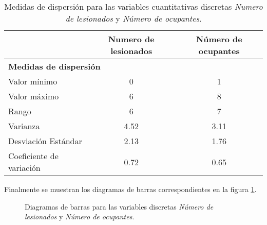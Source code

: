 \begin{table}[!htbp]
    \begin{footnotesize}
        \centering
        \begin{tabular}{lc|c}
            \toprule
            {} & \textbf{Numero de lesionados} & \textbf{Número de ocupantes} \\
            \bottomrule
            \toprule
            \multicolumn{3}{l}{\textbf{Medidas de dispersión}} \\
            \bottomrule
            \toprule
            Valor mínimo & 0 & 1 \\
            \midrule
            Valor máximo & 6 & 8 \\
            \midrule
            Rango & 6 & 7 \\
            \midrule
            Varianza & 4.52 & 3.11 \\
            \midrule
            Desviación Estándar & 2.13 & 1.76 \\
            \midrule
            Coeficiente de variación & 0.72 & 0.65 \\
            \bottomrule
        \end{tabular}
        \caption{\footnotesize{Medidas de dispersión para las variables cuantitativas discretas  \emph{Numero de lesionados} y \emph{Número de ocupantes}.}}
        \label{tab:variablesDiscretasMedidasDispersion}
    \end{footnotesize}
\end{table}
\newpage
Finalmente se muestran los diagramas de barras correspondientes en la figura \ref{fig:diagramasBarrasVariablesDiscretas}.\par
\begin{figure}[!ht]
    \centering
    \noindent\parbox[][][c]{.45\linewidth}{
        
    }
    \parbox[][][c]{.45\linewidth}{
        
    }\par
    \caption{\footnotesize{Diagramas de barras para las variables discretas \emph{Número de lesionados} y \emph{Número de ocupantes}.}}
    \label{fig:diagramasBarrasVariablesDiscretas}
\end{figure}
